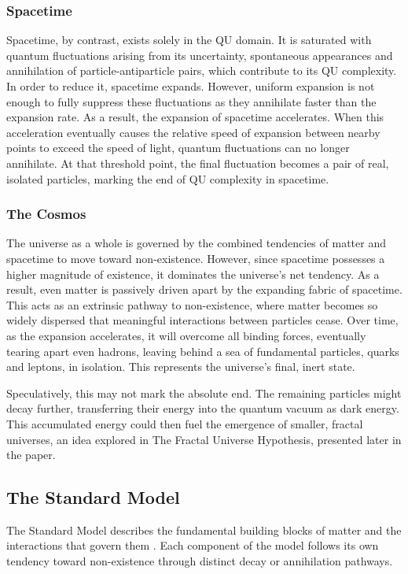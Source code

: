 \documentclass{article}
\begin{document}
\subsubsection{Spacetime}
Spacetime, by contrast, exists solely in the QU domain. It is saturated with quantum fluctuations arising from its uncertainty, spontaneous appearances and annihilation of particle-antiparticle pairs, which contribute to its QU complexity. In order to reduce it, spacetime expands. However, uniform expansion is not enough to fully suppress these fluctuations as they annihilate faster than the expansion rate. As a result, the expansion of spacetime accelerates. When this acceleration eventually causes the relative speed of expansion between nearby points to exceed the speed of light, quantum fluctuations can no longer annihilate. At that threshold point, the final fluctuation becomes a pair of real, isolated particles, marking the end of QU complexity in spacetime.

\subsubsection{The Cosmos}
The universe as a whole is governed by the combined tendencies of matter and spacetime to move toward non-existence. However, since spacetime possesses a higher magnitude of existence, it dominates the universe's net tendency. As a result, even matter is passively driven apart by the expanding fabric of spacetime. This acts as an extrinsic pathway to non-existence, where matter becomes so widely dispersed that meaningful interactions between particles cease. Over time, as the expansion accelerates, it will overcome all binding forces, eventually tearing apart even hadrons, leaving behind a sea of fundamental particles, quarks and leptons, in isolation. This represents the universe's final, inert state.

Speculatively, this may not mark the absolute end. The remaining particles might decay further, transferring their energy into the quantum vacuum as dark energy. This accumulated energy could then fuel the emergence of smaller, fractal universes, an idea explored in The Fractal Universe Hypothesis, presented later in the paper.


\subsection{The Standard Model}

The Standard Model describes the fundamental building blocks of matter and the interactions that govern them \cite{standardmodel}. Each component of the model follows its own tendency toward non-existence through distinct decay or annihilation pathways.
\end{document}
